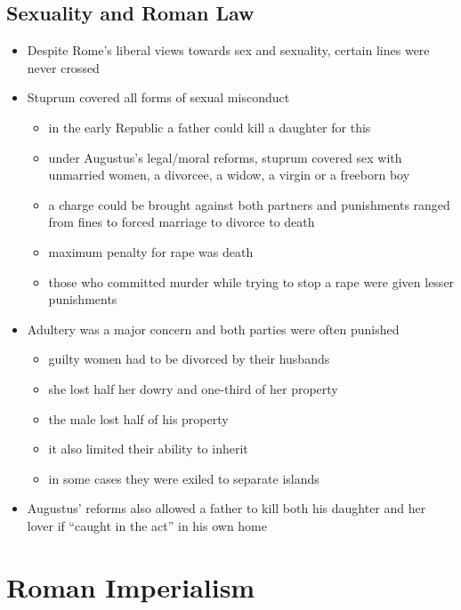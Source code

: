 \documentclass[12pt, twoside]{article}
\begin{document}
\subsection{Sexuality and Roman Law}
\begin{itemize}
\item Despite Rome’s liberal views towards sex and sexuality, certain lines were never crossed
\item Stuprum covered all forms of sexual misconduct
	\begin{itemize}
	\item in the early Republic a father could kill a daughter for this
	\item under Augustus’s legal/moral reforms, stuprum covered sex with unmarried women, a divorcee, a widow, a virgin or a freeborn boy
	\item a charge could be brought against both partners and punishments ranged from fines to forced marriage to divorce to death
	\item maximum penalty for rape was death
	\item those who committed murder while trying to stop a rape were given lesser punishments
	\end{itemize}
\item Adultery was a major concern and both parties were often punished
	\begin{itemize}
	\item guilty women had to be divorced by their husbands
	\item she lost half her dowry and one-third of her property
	\item the male lost half of his property
	\item it also limited their ability to inherit
	\item in some cases they were exiled to separate islands
	\end{itemize}
\item Augustus’ reforms also allowed a father to kill both his daughter and her lover if “caught in the act” in his own home
\end{itemize}

\section{Roman Imperialism}
\end{document}

